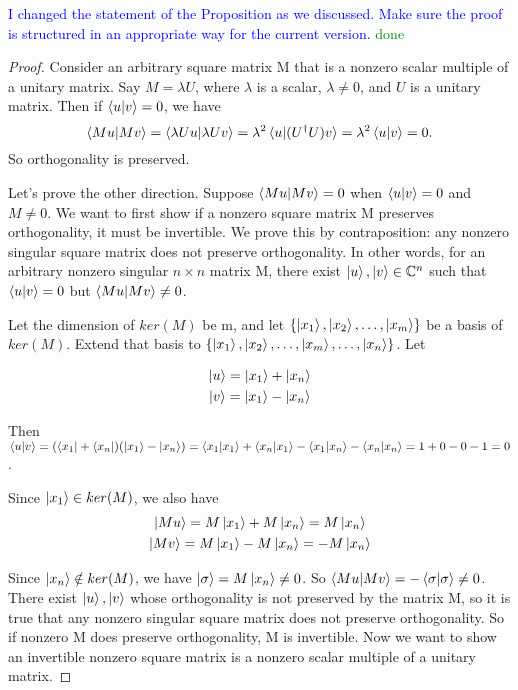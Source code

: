 \textcolor{blue}{I changed the statement of the Proposition as we discussed.  Make sure the proof is structured in an appropriate way for the current version.} \textcolor{green}{done}


\begin{proof}
Consider an arbitrary square matrix M that is a nonzero scalar multiple of a unitary matrix. Say $M=\lambda U$, where $\lambda$ is a scalar, $\lambda \ne 0$, and $U$ is a unitary matrix.
Then if $\braket{u|v}=0$, we have
$$\braket{Mu|Mv}=\braket{\lambda Uu|\lambda Uv}=\lambda^2 \braket{u|(U^\dagger U)v}=\lambda^2 \braket{u|v}=0.$$ So orthogonality is preserved.

Let's prove the other direction. Suppose $\braket{Mu|Mv}=0$ when $\braket{u|v}=0$ and $M \ne 0$. We want to first show if a nonzero square matrix M preserves orthogonality, it must be invertible.
We prove this by contraposition: any nonzero singular square matrix does not preserve orthogonality. In other words, for an arbitrary nonzero singular $n \times n$ matrix M, there exist $\ket{u}, \ket{v} \in \mathbb{C}^n$ such that $\braket{u|v}=0$ but $\braket{Mu|Mv} \ne 0$.

Let the dimension of $ker(M)$ be m, and let $\{\ket{x_1}, \ket{x_2},\hdots, \ket{x_m}\}$ be a basis of $ker(M)$. Extend that basis to $\{\ket{x_1}, \ket{x_2},\hdots, \ket{x_m}, \hdots, \ket{x_n}\}$. Let

\begin{gather*}
    \ket{u}=\ket{x_1}+\ket{x_n}\\
    \ket{v}=\ket{x_1}-\ket{x_n}
\end{gather*}

Then $\braket{u|v}=(\bra{x_1}+\bra{x_n})(\ket{x_1}-\ket{x_n})=\braket{x_1|x_1}+\braket{x_n|x_1}-\braket{x_1|x_n}-\braket{x_n|x_n}=1+0-0-1=0$.

Since $\ket{x_1} \in ker(M)$, we also have
\begin{gather*}
    \ket{Mu}=M\ket{x_1}+M\ket{x_n}=M\ket{x_n}\\
    \ket{Mv}=M\ket{x_1}-M\ket{x_n}=-M\ket{x_n}    
\end{gather*}

Since $\ket{x_n} \notin ker(M)$, we have $\ket{\sigma}=M\ket{x_n} \ne 0$. So $\braket{Mu|Mv}=-\braket{\sigma|\sigma} \ne 0$. There exist $\ket{u}, \ket{v}$ whose orthogonality is not preserved by the matrix M, so it is true that any nonzero singular square matrix does not preserve orthogonality. So if nonzero M does preserve orthogonality, M is invertible. Now we want to show an invertible nonzero square matrix is a nonzero scalar multiple of a unitary matrix.


\end{proof}
